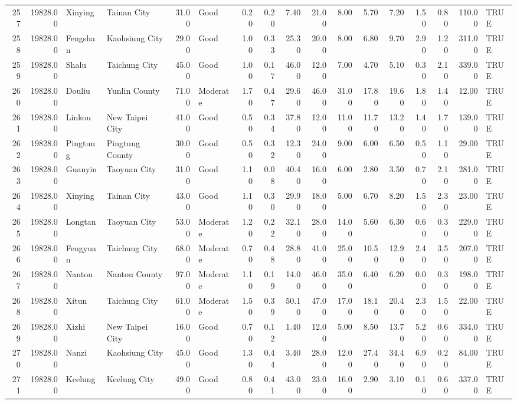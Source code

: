 \begin{table}[ht]
\begin{tabular}{rrllrlrrrrrrrrrrl}
  257 & 19828.00 & Xinying & Tainan City & 31.00 & Good & 0.20 & 0.20 & 7.40 & 21.00 & 8.00 & 5.70 & 7.20 & 1.50 & 0.80 & 110.00 & TRUE \\ 
  258 & 19828.00 & Fengshan & Kaohsiung City & 29.00 & Good & 1.00 & 0.33 & 25.30 & 20.00 & 8.00 & 6.80 & 9.70 & 2.90 & 1.20 & 311.00 & TRUE \\ 
  259 & 19828.00 & Shalu & Taichung City & 45.00 & Good & 1.00 & 0.17 & 46.00 & 12.00 & 7.00 & 4.70 & 5.10 & 0.30 & 2.10 & 339.00 & TRUE \\ 
  260 & 19828.00 & Douliu & Yunlin County & 71.00 & Moderate & 1.70 & 0.47 & 29.60 & 46.00 & 31.00 & 17.80 & 19.60 & 1.80 & 1.40 & 12.00 & TRUE \\ 
  261 & 19828.00 & Linkou & New Taipei City & 41.00 & Good & 0.50 & 0.34 & 37.80 & 12.00 & 11.00 & 11.70 & 13.20 & 1.40 & 1.70 & 139.00 & TRUE \\ 
  262 & 19828.00 & Pingtung & Pingtung County & 30.00 & Good & 0.50 & 0.32 & 12.30 & 24.00 & 9.00 & 6.00 & 6.50 & 0.50 & 1.10 & 29.00 & TRUE \\ 
  263 & 19828.00 & Guanyin & Taoyuan City & 31.00 & Good & 1.10 & 0.08 & 40.40 & 16.00 & 6.00 & 2.80 & 3.50 & 0.70 & 2.10 & 281.00 & TRUE \\ 
  264 & 19828.00 & Xinying & Tainan City & 43.00 & Good & 1.10 & 0.30 & 29.90 & 18.00 & 5.00 & 6.70 & 8.20 & 1.50 & 2.30 & 23.00 & TRUE \\ 
  265 & 19828.00 & Longtan & Taoyuan City & 53.00 & Moderate & 1.20 & 0.22 & 32.10 & 28.00 & 14.00 & 5.60 & 6.30 & 0.60 & 0.30 & 229.00 & TRUE \\ 
  266 & 19828.00 & Fengyuan & Taichung City & 68.00 & Moderate & 0.70 & 0.48 & 28.80 & 41.00 & 25.00 & 10.50 & 12.90 & 2.40 & 3.50 & 207.00 & TRUE \\ 
  267 & 19828.00 & Nantou & Nantou County & 97.00 & Moderate & 1.10 & 0.19 & 14.00 & 46.00 & 35.00 & 6.40 & 6.20 & 0.00 & 0.30 & 198.00 & TRUE \\ 
  268 & 19828.00 & Xitun & Taichung City & 61.00 & Moderate & 1.50 & 0.39 & 50.10 & 47.00 & 17.00 & 18.10 & 20.40 & 2.30 & 1.50 & 22.00 & TRUE \\ 
  269 & 19828.00 & Xizhi & New Taipei City & 16.00 & Good & 0.70 & 0.12 & 1.40 & 12.00 & 5.00 & 8.50 & 13.70 & 5.20 & 0.60 & 334.00 & TRUE \\ 
  270 & 19828.00 & Nanzi & Kaohsiung City & 45.00 & Good & 1.30 & 0.44 & 3.40 & 28.00 & 12.00 & 27.40 & 34.40 & 6.90 & 0.20 & 84.00 & TRUE \\ 
  271 & 19828.00 & Keelung & Keelung City & 49.00 & Good & 0.80 & 0.41 & 43.00 & 23.00 & 16.00 & 2.90 & 3.10 & 0.10 & 0.60 & 337.00 & TRUE \\ 

\end{tabular}
\end{table}
